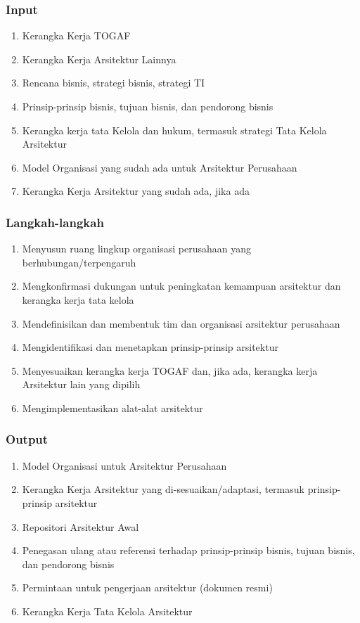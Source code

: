 \documentclass[aspectratio=169, table]{beamer}
\begin{document}
	\begin{frame}
		\frametitle{Input}
		\begin{enumerate}
			\item Kerangka Kerja TOGAF
			\item Kerangka Kerja Arsitektur Lainnya
			\item Rencana bisnis, strategi bisnis, strategi TI
			\item Prinsip-prinsip bisnis, tujuan bisnis, dan pendorong bisnis
			\item Kerangka kerja tata Kelola dan hukum, termasuk strategi Tata Kelola Arsitektur
			\item Model Organisasi yang sudah ada untuk Arsitektur Perusahaan
			\item Kerangka Kerja Arsitektur yang sudah ada, jika ada
		\end{enumerate}
	\end{frame}

	\begin{frame}
		\frametitle{Langkah-langkah}
		\begin{enumerate}
			\item Menyusun ruang lingkup organisasi perusahaan yang berhubungan/terpengaruh
			\item Mengkonfirmasi dukungan untuk peningkatan kemampuan arsitektur dan kerangka kerja tata kelola
			\item Mendefinisikan dan membentuk tim dan organisasi arsitektur perusahaan
			\item Mengidentifikasi dan menetapkan prinsip-prinsip arsitektur
			\item Menyesuaikan kerangka kerja TOGAF dan, jika ada, kerangka kerja Arsitektur lain yang dipilih
			\item Mengimplementasikan alat-alat arsitektur
		\end{enumerate}
	\end{frame}

	\begin{frame}
		\frametitle{Output}
		\begin{enumerate}
			\item Model Organisasi untuk Arsitektur Perusahaan
			\item Kerangka Kerja Arsitektur yang di-sesuaikan/adaptasi, termasuk prinsip-prinsip arsitektur
			\item Repositori Arsitektur Awal
			\item Penegasan ulang atau referensi terhadap prinsip-prinsip bisnis, tujuan bisnis, dan pendorong bisnis
			\item Permintaan untuk pengerjaan arsitektur (dokumen resmi)
			\item Kerangka Kerja Tata Kelola Arsitektur
		\end{enumerate}
	\end{frame}
\end{document}
